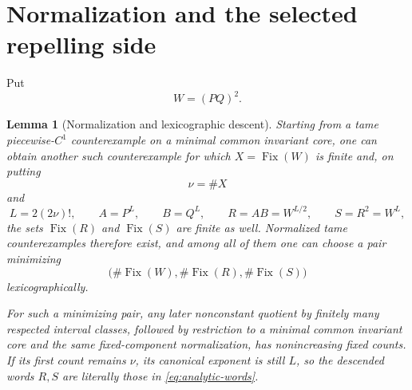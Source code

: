 \documentclass[11pt]{article}
\newtheorem{lemma}[theorem]{Lemma}
\theoremstyle{definition}
\theoremstyle{remark}
\newcommand{\Fix}{\operatorname{Fix}}
\begin{document}
\section{Normalization and the selected repelling side}

Put
\begin{equation}\label{eq:analytic-W}
 W=(PQ)^2.
\end{equation}

\begin{lemma}[Normalization and lexicographic descent]
\label{lem:analytic-normalization}
Starting from a tame piecewise-\(C^1\) counterexample on a minimal common
invariant core, one can obtain another such counterexample for which
\(X=\Fix(W)\) is finite and, on putting
\[
 \nu=\#X
\]
and
\begin{equation}\label{eq:analytic-words}
 L=2(2\nu)!,\qquad A=P^L,\qquad B=Q^L,\qquad
 R=AB=W^{L/2},\qquad S=R^2=W^L,
\end{equation}
the sets \(\Fix(R)\) and \(\Fix(S)\) are finite as well.  Normalized tame
counterexamples therefore exist, and among all of them one can choose a pair
minimizing
\begin{equation}\label{eq:analytic-mintriple}
 \bigl(\#\Fix(W),\#\Fix(R),\#\Fix(S)\bigr)
\end{equation}
lexicographically.

For such a minimizing pair, any later nonconstant quotient by finitely many respected
interval classes, followed by restriction to a minimal common invariant core
and the same fixed-component normalization, has nonincreasing fixed counts.
If its first count remains \(\nu\), its canonical exponent is still \(L\), so
the descended words \(R,S\) are literally those in
\eqref{eq:analytic-words}.
\end{lemma}
\end{document}
